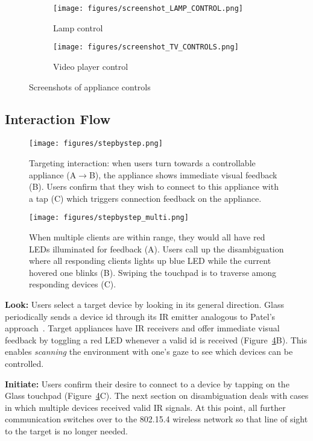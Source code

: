 \begin{figure}
\centering
\begin{subfigure}{.5\columnwidth}
  \centering
  \texttt{[image: figures/screenshot\_LAMP\_CONTROL.png]}
  \caption{Lamp control}
  \label{fig:control_lamp}
\end{subfigure}%
\begin{subfigure}{.5\columnwidth}
  \centering
  \texttt{[image: figures/screenshot\_TV\_CONTROLS.png]}
  \caption{Video player control}
  \label{fig:control_tv}
\end{subfigure}
\caption{Screenshots of appliance controls}
\label{fig:test}
\end{figure}

\subsection{Interaction Flow}

\begin{figure}[t!]
\centering
\texttt{[image: figures/stepbystep.png]}
\caption{Targeting interaction: when users turn towards a controllable appliance (A$\rightarrow$B), the appliance shows immediate visual feedback (B). Users confirm that they wish to connect to this appliance with a tap (C) which triggers connection feedback on the appliance.}
\label{fig:interaction}
\end{figure}

\begin{figure}[t!]
\centering
\texttt{[image: figures/stepbystep\_multi.png]}
\caption{When multiple clients are within range, they would all have red LEDs illuminated for feedback (A). Users call up the disambiguation where all responding clients lights up blue LED while the current hovered one blinks (B). Swiping the touchpad is to traverse among responding devices (C).}
\label{fig:interaction_multi}
\end{figure}

{\bf Look:} Users select a target device by looking in its general direction.
Glass periodically sends a device id through its IR emitter analogous to Patel's approach~\cite{patel_2-way_2003}. Target appliances have IR receivers and offer immediate visual feedback by toggling a red LED whenever a valid id is received (Figure~\ref{fig:interaction}B). This enables {\em scanning} the environment with one's gaze to see which devices can be controlled.

{\bf Initiate:} Users confirm their desire to connect to a device by tapping on the Glass touchpad (Figure~\ref{fig:interaction}C). The next section on disambiguation deals with cases in which multiple devices received valid IR signals. At this point, all further communication switches over to the 802.15.4 wireless network so that line of sight to the target is no longer needed.

